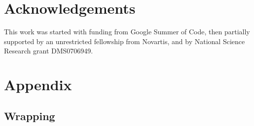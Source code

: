 \documentclass[12pt]{article}
\begin{document}
\section*{Acknowledgements}
This work was started with funding from Google Summer of Code,
then partially supported by an unrestricted fellowship from
Novartis, and by National Science Research grant DMS0706949.




\newpage
\section*{Appendix}
\renewcommand{\thesubsection}{\Alph{subsection}}
\setcounter{table}{0}
\renewcommand{\thetable}{A\arabic{table}}
\setcounter{figure}{0}
\renewcommand{\thefigure}{A\arabic{figure}}

\subsection{Wrapping}\label{sub:appendix-wrapping}
\end{document}
